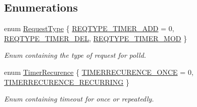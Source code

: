 \subsection*{Enumerations}
\begin{DoxyCompactItemize}
\item 
enum \hyperlink{group__SYSFRAMEWORK__POLLD_gae10b07f2d0feb103db7fe4cfd192e5af}{Request\-Type} \{ \hyperlink{group__SYSFRAMEWORK__POLLD_ggae10b07f2d0feb103db7fe4cfd192e5afa63e66fe0a1e1de6cfed3c85a9aa48315}{R\-E\-Q\-T\-Y\-P\-E\-\_\-\-T\-I\-M\-E\-R\-\_\-\-A\-D\-D} = 0, 
\hyperlink{group__SYSFRAMEWORK__POLLD_ggae10b07f2d0feb103db7fe4cfd192e5afa08e0354be826a836f72ebfa716a7d290}{R\-E\-Q\-T\-Y\-P\-E\-\_\-\-T\-I\-M\-E\-R\-\_\-\-D\-E\-L}, 
\hyperlink{group__SYSFRAMEWORK__POLLD_ggae10b07f2d0feb103db7fe4cfd192e5afa3a3504998275abee398a70197a8bf6e4}{R\-E\-Q\-T\-Y\-P\-E\-\_\-\-T\-I\-M\-E\-R\-\_\-\-M\-O\-D}
 \}
\begin{DoxyCompactList}\small\item\em Enum containing the type of request for polld. \end{DoxyCompactList}\item 
enum \hyperlink{group__SYSFRAMEWORK__POLLD_ga8d3aaea1dc4569e14bc3b498c3131b2a}{Timer\-Recurence} \{ \hyperlink{group__SYSFRAMEWORK__POLLD_gga8d3aaea1dc4569e14bc3b498c3131b2aa295266347c0bdf8dcd25d42a03275c79}{T\-I\-M\-E\-R\-R\-E\-C\-U\-R\-E\-N\-C\-E\-\_\-\-O\-N\-C\-E} = 0, 
\hyperlink{group__SYSFRAMEWORK__POLLD_gga8d3aaea1dc4569e14bc3b498c3131b2aacfa2040c602a9b9afe857229cc05d3ad}{T\-I\-M\-E\-R\-R\-E\-C\-U\-R\-E\-N\-C\-E\-\_\-\-R\-E\-C\-U\-R\-R\-I\-N\-G}
 \}
\begin{DoxyCompactList}\small\item\em Enum containing timeout for once or repeatedly. \end{DoxyCompactList}\end{DoxyCompactItemize}
